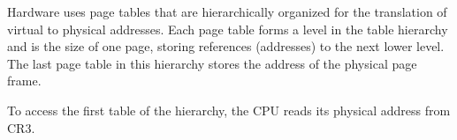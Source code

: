 %     
Hardware uses page tables that are hierarchically organized for the translation
of virtual to physical addresses. Each page table forms a level in the table
hierarchy and is the size of one page, storing references (addresses) to the
next lower level. The last page table in this hierarchy stores the address of
the physical page frame.

To access the first table of the hierarchy, the CPU reads its physical address
from CR3.\\

